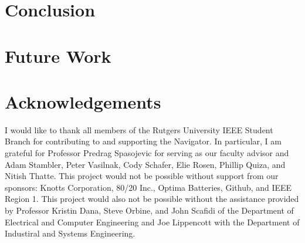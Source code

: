 \documentclass[11pt,twocolumn]{article}
\begin{document}
\section{Conclusion}
\label{sec:conclusion}

\section{Future Work}
\label{sec:future}

\section{Acknowledgements}
I would like to thank all members of the Rutgers University IEEE Student Branch
for contributing to and supporting the Navigator. In particular, I am grateful
for Professor Predrag Spasojevic for serving as our faculty advisor and Adam
Stambler, Peter Vasilnak, Cody Schafer, Elie Rosen, Phillip Quiza, and Nitish
Thatte. This project would not be possible without support from our sponsors:
Knotts Corporation, 80/20 Inc., Optima Batteries, Github, and IEEE Region 1.
This project would also not be possible without the assistance provided by
Professor Kristin Dana, Steve Orbine, and John Scafidi of the Department of
Electrical and Computer Engineering and Joe Lippencott with the Department of
Industiral and Systems Engineering.
\end{document}
